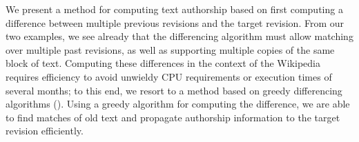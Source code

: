 We present a method for computing text authorship based on
first computing a difference between multiple previous revisions and
the target revision.
From our two examples, we see already that the differencing
algorithm must allow matching over multiple past revisions, as
well as supporting multiple copies of the same block of text.
Computing these differences in the context of the Wikipedia
requires efficiency to avoid unwieldy CPU requirements
or execution times of several months;
to this end, we resort to a method based on greedy differencing
algorithms ().
Using a greedy algorithm for computing the difference, we are
able to find matches of old text and propagate authorship
information to the target revision efficiently.

